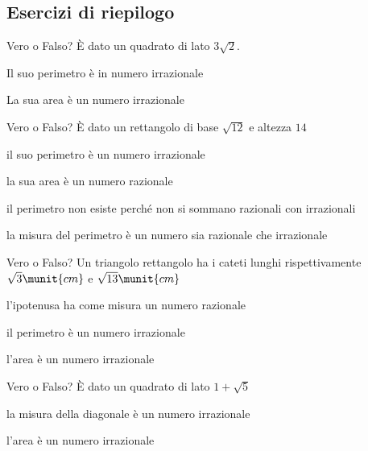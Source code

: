 \subsection*{Esercizi di riepilogo}

\begin{esercizio}
\label{ese:2.90}
Vero o Falso? È dato un quadrato di lato \(3\sqrt 2\).

\begin{enumeratea}
\item Il suo perimetro è in numero irrazionale \hfill\verofalso
\item La sua area è un numero irrazionale \hfill\verofalso
\end{enumeratea}
\end{esercizio}

\begin{esercizio}
\label{ese:2.91}
Vero o Falso? È dato un rettangolo di base \(\sqrt{12}\) e altezza \(14\)

\begin{enumeratea}
\item il suo perimetro è un numero irrazionale \hfill\verofalso
\item la sua area è un numero razionale \hfill\verofalso
\item il perimetro non esiste perché non si sommano razionali con 
irrazionali \hfill\verofalso
\item la misura del perimetro è un numero sia razionale che 
irrazionale \hfill\verofalso
\end{enumeratea}
\end{esercizio}

\begin{esercizio}%
Vero o Falso? Un triangolo rettangolo ha i cateti lunghi 
rispettivamente \(\sqrt 3\munit{cm}\) e \(\sqrt{13}\munit{cm}\)

\begin{enumeratea}
\item l'ipotenusa ha come misura un numero razionale \hfill\verofalso
\item il perimetro è un numero irrazionale \hfill\verofalso
\item l'area è un numero irrazionale \hfill\verofalso
\end{enumeratea}
\end{esercizio}


\begin{esercizio}%
Vero o Falso? È dato un quadrato di lato \(1+\sqrt 5\)
\begin{enumeratea}
\item la misura della diagonale è un numero irrazionale \hfill\verofalso
\item l'area è un numero irrazionale \hfill\verofalso
\end{enumeratea}
\end{esercizio}

